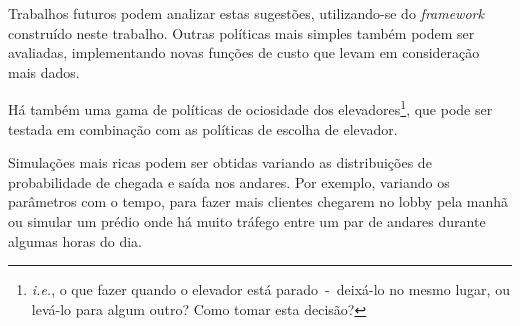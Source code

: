 Trabalhos futuros podem analizar estas sugestões, utilizando-se do
\textit{framework} construído neste trabalho. Outras políticas mais simples
também podem ser avaliadas, implementando novas funções de custo que levam em
consideração mais dados.

Há também uma gama de políticas de ociosidade dos
elevadores\footnote{\textit{i.e.}, o que fazer quando o elevador está
  parado~-~deixá-lo no mesmo lugar, ou levá-lo para algum outro? Como tomar esta
decisão?}, que pode ser testada em combinação com as políticas de escolha de elevador.

Simulações mais ricas podem ser obtidas variando as distribuições de
probabilidade de chegada e saída nos andares. Por exemplo, variando os
parâmetros com o tempo, para fazer mais clientes chegarem no lobby pela manhã ou
simular um prédio onde há muito tráfego entre um par de andares durante algumas
horas do dia.
